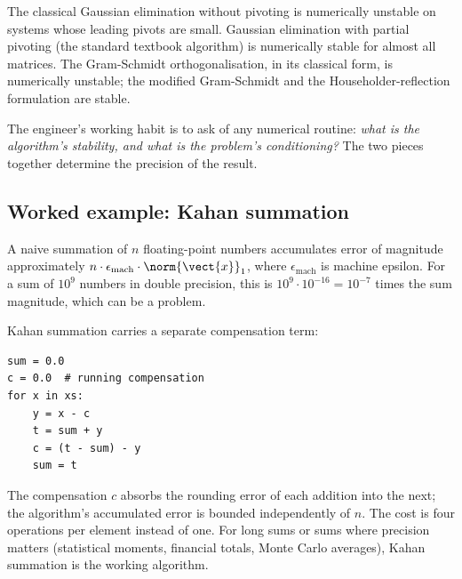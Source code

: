The classical Gaussian elimination without pivoting is numerically unstable on systems whose leading pivots are small. Gaussian elimination with partial pivoting (the standard textbook algorithm) is numerically stable for almost all matrices. The Gram-Schmidt orthogonalisation, in its classical form, is numerically unstable; the modified Gram-Schmidt and the Householder-reflection formulation are stable.

The engineer's working habit is to ask of any numerical routine: \emph{what is the algorithm's stability, and what is the problem's conditioning?} The two pieces together determine the precision of the result.

\subsection{Worked example: Kahan summation}

A naive summation of $n$ floating-point numbers accumulates error of magnitude approximately $n \cdot \epsilon_{\mathrm{mach}} \cdot \norm{\vect{x}}_1$, where $\epsilon_{\mathrm{mach}}$ is machine epsilon. For a sum of $10^9$ numbers in double precision, this is $10^9 \cdot 10^{-16} = 10^{-7}$ times the sum magnitude, which can be a problem.

Kahan summation \cite{text:knuth-taocp2} carries a separate compensation term:

\begin{verbatim}
sum = 0.0
c = 0.0  # running compensation
for x in xs:
    y = x - c
    t = sum + y
    c = (t - sum) - y
    sum = t
\end{verbatim}

The compensation $c$ absorbs the rounding error of each addition into the next; the algorithm's accumulated error is bounded independently of $n$. The cost is four operations per element instead of one. For long sums or sums where precision matters (statistical moments, financial totals, Monte Carlo averages), Kahan summation is the working algorithm.

